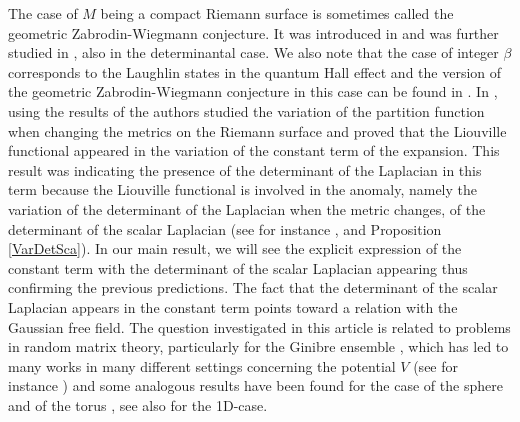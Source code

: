 \documentclass{article}
\theoremstyle{definition}
\theoremstyle{remark}
\begin{document}
 The case of $M$ being a compact Riemann surface is sometimes called the geometric Zabrodin-Wiegmann conjecture. It was introduced in \cite{Klevtsov2014RandomNormalMatrices} and was further studied in \cite{KlevtsovQuillen}, also in the determinantal case. We also note that the case of integer $\beta$ corresponds to the Laughlin states in the quantum Hall effect \cite{KlevtsovGenus,LiebRougerieLocalIncompressibLaughlin} and the version of the geometric Zabrodin-Wiegmann conjecture in this case can be found in \cite{KlevtsovFerrari2014, CanLaskinWiegmann2015,Shen:GeomZabrodin2025}. In \cite{Klevtsov2014RandomNormalMatrices,KlevtsovQuillen}, using the results of \cite{BismutGilletSouleQuillenMetric} the authors studied the variation of the partition function when changing the metrics on the Riemann surface and proved that the Liouville functional appeared in the variation of the constant term of the expansion. This result was indicating the presence of the determinant of the Laplacian in this term because the Liouville functional is involved in the anomaly, namely the variation of the determinant of the Laplacian when the metric changes, of the determinant of the scalar Laplacian (see for instance \cite{OSGOOD1988148,POLYAKOV1981207}, and Proposition \ref{VarDetSca}). In our main result, we will see the explicit expression of the constant term with the determinant of the scalar Laplacian appearing thus confirming the previous predictions. The fact that the determinant of the scalar Laplacian appears in the constant term points toward a relation with the Gaussian free field. The question investigated in this article is related to problems in random matrix theory, particularly for the Ginibre ensemble \cite{ForresterLogGasesAndRandomMatrices,Ginibre}, which has led to many works in many different settings concerning the potential $V$ (see for instance \cite{ameur2025twodimensionalcoulombgasfluctuations,Byun2024FreeEnergy,AllardForresterLahiryShenPartitionFunction,ByunAnomalousFreeEnergy,BauerschmidtBourgadeNikulaYayTwoDimCoulombQuasiFreeCLT,BBNYLocalDensity2D1OCP,RougerieFreeEnergyHoles}) and some analogous results have been found for the case of the sphere \cite{Ginibre,ByunPartition2023,ByunFreeEnergy2025} and of the torus \cite{Forrester_2006}, see also \cite{BorotGuionnetAsymptoticExpansionBetaMultiCut,BorotGuionnetOneCut} for the 1D-case.
 
\end{document}
